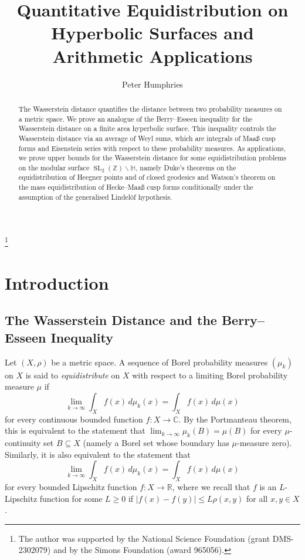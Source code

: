 \documentclass[11pt,a4paper]{amsart}
\newcommand{\C}{\mathbb{C}}
\newcommand{\Hb}{\mathbb{H}}
\newcommand{\R}{\mathbb{R}}
\newcommand{\Z}{\mathbb{Z}}
\DeclareMathOperator{\SL}{SL}
\numberwithin{equation}{section}
\theoremstyle{remark}
\theoremstyle{definition}
\begin{document}
\title{Quantitative Equidistribution on Hyperbolic Surfaces and Arithmetic Applications}

\author{Peter Humphries}

\address{Department of Mathematics, University of Virginia, Charlottesville, VA 22904, USA}



\thanks{The author was supported by the National Science Foundation (grant DMS-2302079) and by the Simons Foundation (award 965056).}


\begin{abstract}
The Wasserstein distance quantifies the distance between two probability measures on a metric space. We prove an analogue of the Berry--Esseen inequality for the Wasserstein distance on a finite area hyperbolic surface. This inequality controls the Wasserstein distance via an average of Weyl sums, which are integrals of Maa\ss{} cusp forms and Eisenstein series with respect to these probability measures. As applications, we prove upper bounds for the Wasserstein distance for some equidistribution problems on the modular surface $\SL_2(\Z) \backslash \Hb$, namely Duke's theorems on the equidistribution of Heegner points and of closed geodesics and Watson's theorem on the mass equidistribution of Hecke--Maa\ss{} cusp forms conditionally under the assumption of the generalised Lindel\"{o}f hypothesis.
\end{abstract}


\maketitle


\section{Introduction}

\subsection{The Wasserstein Distance and the Berry--Esseen Inequality}

Let $(X,\rho)$ be a metric space. A sequence of Borel probability measures $(\mu_k)$ on $X$ is said to \emph{equidistribute} on $X$ with respect to a limiting Borel probability measure $\mu$ if
\[\lim_{k \to \infty} \int_{X} f(x) \, d\mu_k(x) = \int_{X} f(x) \, d\mu(x)\]
for every continuous bounded function $f : X \to \C$. By the Portmanteau theorem, this is equivalent to the statement that $\lim_{k \to \infty} \mu_k(B) = \mu(B)$ for every $\mu$-continuity set $B \subseteq X$ (namely a Borel set whose boundary has $\mu$-measure zero). Similarly, it is also equivalent to the statement that
\[\lim_{k \to \infty} \int_{X} f(x) \, d\mu_k(x) = \int_{X} f(x) \, d\mu(x)\]
for every bounded Lipschitz function $f : X \to \R$, where we recall that $f$ is an $L$-Lipschitz function for some $L \geq 0$ if $\left|f(x) - f(y)\right| \leq L \rho(x,y)$ for all $x,y \in X$.
\end{document}
